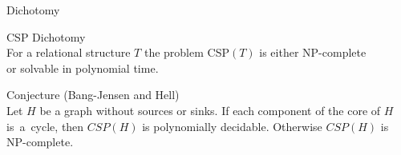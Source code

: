 \documentclass[aspectratio=169]{beamer}
\begin{document}

    
    
    




\begin{frame}{Dichotomy}

\textcolor{cfblue}{CSP Dichotomy} \\
For a relational structure \(T\) the problem CSP\((T)\) is either NP-complete \\
or solvable in polynomial time.

\pause
\vspace{1.5em}
\textcolor{cfblue}{Conjecture (Bang-Jensen and Hell)} \\
Let \(H\) be a graph without sources or sinks. If each component of the core of \(H\) is~a~cycle, then \(CSP(H)\) is polynomially decidable. Otherwise \(CSP(H)\) is NP-complete.

\end{frame}

\end{document}
